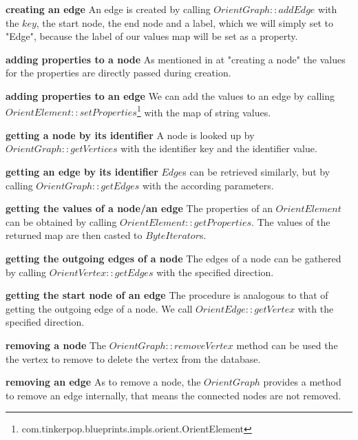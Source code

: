 \textbf{creating an edge} \newline
An edge is created by calling $ OrientGraph::addEdge $ with the $ key $,
the start node,
the end node and a label,
which we will simply set to "Edge",
because the label of our values map will be set as a property.

\textbf{adding properties to a node} \newline
As mentioned in at "creating a node" the values for the properties are directly passed during creation.

\textbf{adding properties to an edge} \newline
We can add the values to an edge by calling $ OrientElement::setProperties $\footnote{com.tinkerpop.blueprints.impls.orient.OrientElement} with the map of string values.

\textbf{getting a node by its identifier} \newline
A node is looked up by $ OrientGraph::getVertices $ with the identifier key and the identifier value.

\textbf{getting an edge by its identifier} \newline
$ Edge $s can be retrieved similarly,
but by calling $ OrientGraph::getEdges $ with the according parameters.

\textbf{getting the values of a node/an edge} \newline
The properties of an $ OrientElement $ can be obtained by calling $ OrientElement::getProperties $.
The values of the returned map are then casted to $ ByteIterator $s.

\textbf{getting the outgoing edges of a node} \newline
The edges of a node can be gathered by calling $ OrientVertex::getEdges $ with the specified direction.

\textbf{getting the start node of an edge} \newline
The procedure is analogous to that of getting the outgoing edge of a node.
We call $ OrientEdge::getVertex $ with the specified direction.

\textbf{removing a node} \newline
The $ OrientGraph::removeVertex $ method can be used the the vertex to remove to delete the vertex from the database.

\textbf{removing an edge} \newline
As to remove a node,
the $ OrientGraph $ provides a method to remove an edge internally,
that means the connected nodes are not removed.

